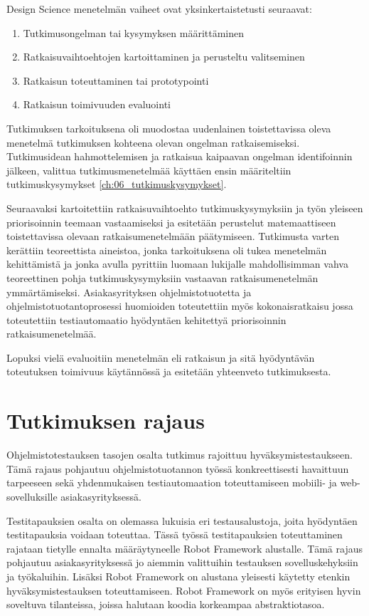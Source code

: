 Design Science menetelmän vaiheet ovat yksinkertaistetusti seuraavat:
\begin{enumerate}
  \item Tutkimusongelman tai kysymyksen määrittäminen
  \item Ratkaisuvaihtoehtojen kartoittaminen ja perusteltu valitseminen
  \item Ratkaisun toteuttaminen tai prototypointi
  \item Ratkaisun toimivuuden evaluointi
\end{enumerate}

Tutkimuksen tarkoituksena oli muodostaa uudenlainen toistettavissa oleva menetelmä tutkimuksen kohteena olevan ongelman ratkaisemiseksi.
Tutkimusidean hahmottelemisen ja ratkaisua kaipaavan ongelman identifoinnin jälkeen, valittua tutkimusmenetelmää käyttäen ensin määriteltiin tutkimuskysymykset \ref{ch:06_tutkimuskysymykset}.

Seuraavaksi kartoitettiin ratkaisuvaihtoehto tutkimuskysymyksiin ja työn yleiseen priorisoinnin teemaan vastaamiseksi ja esitetään perustelut matemaattiseen toistettavissa olevaan ratkaisumenetelmään päätymiseen.
Tutkimusta varten kerättiin teoreettista aineistoa, jonka tarkoituksena oli tukea menetelmän kehittämistä ja jonka avulla pyrittiin luomaan lukijalle mahdollisimman vahva teoreettinen pohja tutkimuskysymyksiin vastaavan ratkaisumenetelmän ymmärtämiseksi.
Asiakasyrityksen ohjelmistotuotetta ja ohjelmistotuotantoprosessi huomioiden toteutettiin myös kokonaisratkaisu jossa toteutettiin testiautomaatio hyödyntäen kehitettyä priorisoinnin ratkaisumenetelmää.

Lopuksi vielä evaluoitiin menetelmän eli ratkaisun ja sitä hyödyntävän toteutuksen toimivuus käytännössä ja esitetään yhteenveto tutkimuksesta.

\section{Tutkimuksen rajaus} \label{ch:06_tutkimuksen_rajaus}

Ohjelmistotestauksen tasojen osalta tutkimus rajoittuu hyväksymistestaukseen.
Tämä rajaus pohjautuu ohjelmistotuotannon työssä konkreettisesti havaittuun tarpeeseen sekä yhdenmukaisen testiautomaation toteuttamiseen mobiili- ja web-sovelluksille asiakasyrityksessä.

Testitapauksien osalta on olemassa lukuisia eri testausalustoja, joita hyödyntäen testitapauksia voidaan toteuttaa.
Tässä työssä testitapauksien toteuttaminen rajataan tietylle ennalta määräytyneelle Robot Framework alustalle.
Tämä rajaus pohjautuu asiakasyrityksessä jo aiemmin valittuihin testauksen sovelluskehyksiin ja työkaluihin.
Lisäksi Robot Framework on alustana yleisesti käytetty etenkin hyväksymistestauksen toteuttamiseen.
Robot Framework on myös erityisen hyvin soveltuva tilanteissa, joissa halutaan koodia korkeampaa abstraktiotasoa.


